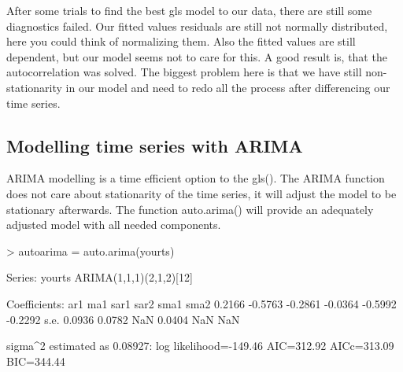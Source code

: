 \documentclass[10pt, a4paper]{article} %
\begin{document}
\noindent After some trials to find the best gls model to our data, there are still some diagnostics failed. Our fitted values residuals are still not normally distributed, here you could think of normalizing them. Also the fitted values are still dependent, but our model seems not to care for this. A good result is, that the autocorrelation was solved. The biggest problem here is that we have still non-stationarity in our model and need to redo all the process after differencing our time series. 



\subsection{Modelling time series with ARIMA }
ARIMA modelling is a time efficient option to the gls(). 
The ARIMA function does not care about stationarity of the time series, it will adjust the model  to be stationary afterwards. 
The function auto.arima() will provide an adequately adjusted model with all needed components. 
\\


\begin{Schunk}
\begin{Sinput}
> autoarima = auto.arima(yourts)
\end{Sinput}
Series: yourts 
ARIMA(1,1,1)(2,1,2)[12]                    

Coefficients:
         ar1      ma1     sar1     sar2     sma1     sma2
      0.2166  -0.5763  -0.2861  -0.0364  -0.5992  -0.2292
s.e.  0.0936   0.0782      NaN   0.0404      NaN      NaN

sigma^2 estimated as 0.08927:  log likelihood=-149.46
AIC=312.92   AICc=313.09   BIC=344.44\end{Schunk}
\end{document}
